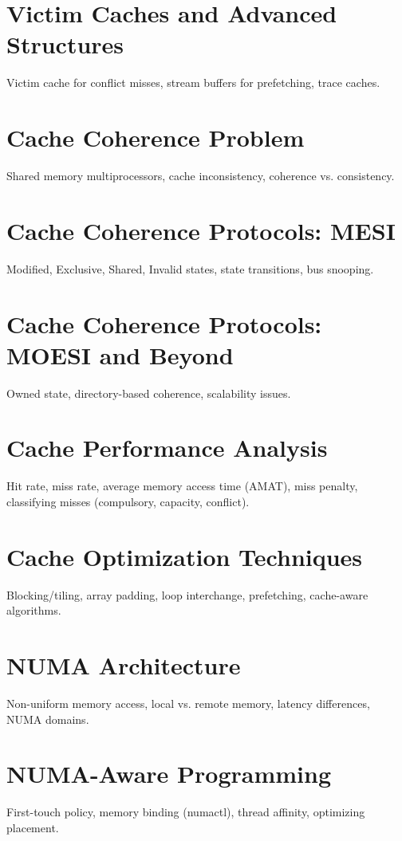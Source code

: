 \chapter{Victim Caches and Advanced Structures}
Victim cache for conflict misses, stream buffers for prefetching, trace caches.

\chapter{Cache Coherence Problem}
Shared memory multiprocessors, cache inconsistency, coherence vs. consistency.

\chapter{Cache Coherence Protocols: MESI}
Modified, Exclusive, Shared, Invalid states, state transitions, bus snooping.

\chapter{Cache Coherence Protocols: MOESI and Beyond}
Owned state, directory-based coherence, scalability issues.

\chapter{Cache Performance Analysis}
Hit rate, miss rate, average memory access time (AMAT), miss penalty, classifying misses (compulsory, capacity, conflict).

\chapter{Cache Optimization Techniques}
Blocking/tiling, array padding, loop interchange, prefetching, cache-aware algorithms.

\chapter{NUMA Architecture}
Non-uniform memory access, local vs. remote memory, latency differences, NUMA domains.

\chapter{NUMA-Aware Programming}
First-touch policy, memory binding (numactl), thread affinity, optimizing placement.

